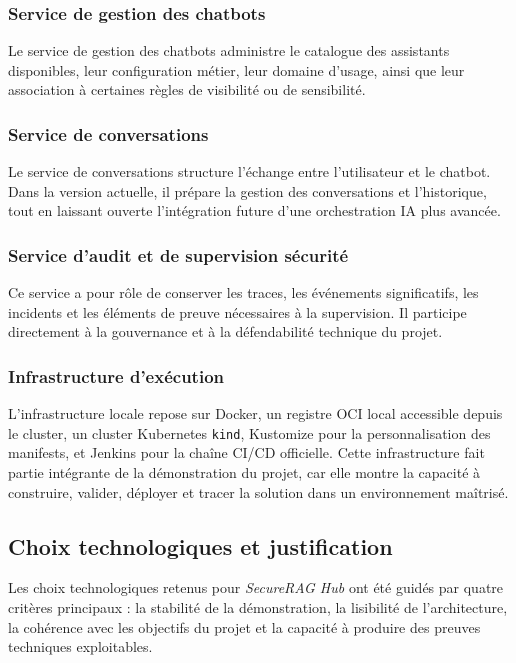 \subsubsection{Service de gestion des chatbots}

Le service de gestion des chatbots administre le catalogue des assistants disponibles, leur configuration métier, leur domaine d’usage, ainsi que leur association à certaines règles de visibilité ou de sensibilité.

\subsubsection{Service de conversations}

Le service de conversations structure l’échange entre l’utilisateur et le chatbot. Dans la version actuelle, il prépare la gestion des conversations et l’historique, tout en laissant ouverte l’intégration future d’une orchestration IA plus avancée.

\subsubsection{Service d’audit et de supervision sécurité}

Ce service a pour rôle de conserver les traces, les événements significatifs, les incidents et les éléments de preuve nécessaires à la supervision. Il participe directement à la gouvernance et à la défendabilité technique du projet.

\subsubsection{Infrastructure d’exécution}

L’infrastructure locale repose sur Docker, un registre OCI local accessible depuis le cluster, un cluster Kubernetes \texttt{kind}, Kustomize pour la personnalisation des manifests, et Jenkins pour la chaîne CI/CD officielle. Cette infrastructure fait partie intégrante de la démonstration du projet, car elle montre la capacité à construire, valider, déployer et tracer la solution dans un environnement maîtrisé.

\subsection{Choix technologiques et justification}

Les choix technologiques retenus pour \textit{SecureRAG Hub} ont été guidés par quatre critères principaux : la stabilité de la démonstration, la lisibilité de l’architecture, la cohérence avec les objectifs du projet et la capacité à produire des preuves techniques exploitables.

